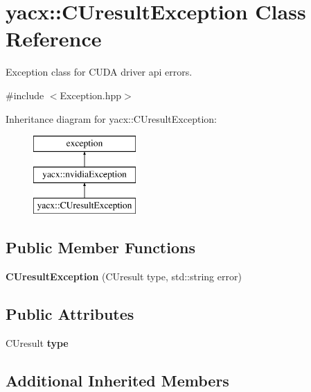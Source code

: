 \hypertarget{classyacx_1_1_c_uresult_exception}{}\section{yacx\+:\+:C\+Uresult\+Exception Class Reference}
\label{classyacx_1_1_c_uresult_exception}


Exception class for C\+U\+DA driver api errors.  




{\ttfamily \#include $<$Exception.\+hpp$>$}

Inheritance diagram for yacx\+:\+:C\+Uresult\+Exception\+:\begin{figure}[H]
\begin{center}
\leavevmode
\includegraphics[height=3.000000cm]{classyacx_1_1_c_uresult_exception}
\end{center}
\end{figure}
\subsection*{Public Member Functions}
\begin{DoxyCompactItemize}
\item 
\mbox{\label{classyacx_1_1_c_uresult_exception_a8b3eabebd5354aa149ee6e2b1fe8f67e}} 
{\bfseries C\+Uresult\+Exception} (C\+Uresult type, std\+::string error)
\end{DoxyCompactItemize}
\subsection*{Public Attributes}
\begin{DoxyCompactItemize}
\item 
\mbox{\label{classyacx_1_1_c_uresult_exception_a1b3e9c65d733f43ff37a69b432e73216}} 
C\+Uresult {\bfseries type}
\end{DoxyCompactItemize}
\subsection*{Additional Inherited Members}


